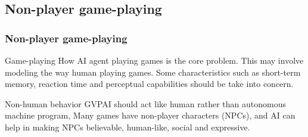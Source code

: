 \documentclass{beamer}
\begin{document}
\subsection{Non-player game-playing}
\begin{frame}
\frametitle{Non-player game-playing}
\begin{block}{Game-playing}
How AI agent playing games is the core problem. This may involve modeling the way human playing games. Some characteristics such as short-term memory, reaction time and perceptual capabilities should be take into concern.
\end{block}

\begin{block}{Non-human behavior}
GVPAI should act like human rather than autonomous machine program, 
Many games have non-player characters (NPCs), and AI can help in making NPCs believable, human-like, social and expressive.
\end{block}
 
\end{frame}

\end{document}
